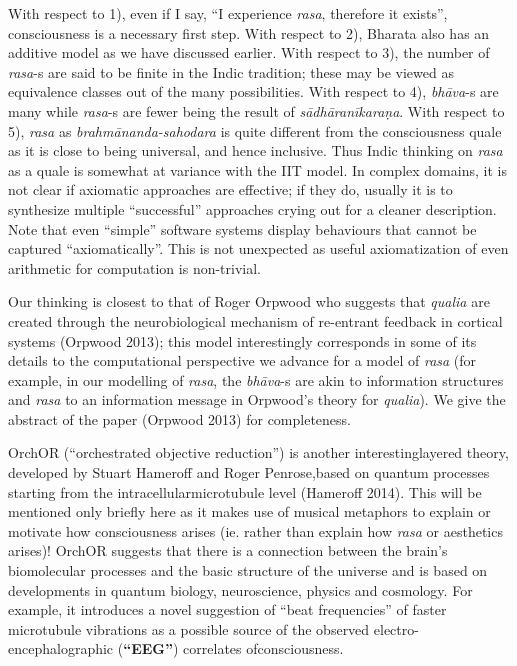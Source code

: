 With respect to 1), even if I say, “I experience \textsl{rasa}, therefore it exists”, consciousness is a necessary first step. With respect to 2), Bharata also has an additive model as we have discussed earlier. With respect to 3), the number of \textsl{rasa}-s are said to be finite in the Indic tradition; these may be viewed as equivalence classes out of the many possibilities. With respect to 4), \textsl{bhāva}-s are many while \textsl{rasa}-s are fewer being the result of \textsl{sādhāranīkaraṇa}. With respect to 5), \textsl{rasa} as  \textsl{brahmānanda-sahodara} is quite different from the consciousness quale as it is close to being universal, and hence inclusive. Thus Indic thinking on \textsl{rasa} as a quale is somewhat at variance with the IIT model. In complex domains, it is not clear if axiomatic approaches are effective; if they do, usually it is to synthesize multiple “successful” approaches crying out for a cleaner description. Note that even “simple” software systems display behaviours that cannot be captured “axiomatically”. This is not unexpected as useful axiomatization of even arithmetic for computation is non-trivial.

Our thinking is closest to that of Roger Orpwood who suggests that \textsl{qualia} are created through the neurobiological mechanism of re-entrant feedback in cortical systems (Orpwood 2013); this model interestingly corresponds in some of its details to the computational perspective we advance for a model of \textsl{rasa} (for example, in our modelling of \textsl{rasa}, the \textsl{bhāva}-s are akin to information structures and \textsl{rasa} to an information message in Orpwood’s theory for \textsl{qualia}). We give the abstract of the paper (Orpwood 2013) for completeness.


OrchOR (“orchestrated objective reduction”) is another interesting\break layered theory, developed by Stuart Hameroff and Roger Penrose,\break based on quantum processes starting from the intracellular\break micro\-tubule level (Hameroff 2014). This will be mentioned only briefly here as it makes use of musical metaphors to explain or motivate how consciousness arises (ie. rather than explain how \textsl{rasa} or aesthetics arises)! OrchOR suggests that there is a connection between the brain’s biomolecular processes and the basic structure of the universe and is based on developments in quantum biology, neuroscience, physics and cosmology. For example, it introduces a novel suggestion of “beat frequencies” of faster microtubule vibrations as a possible source of the observed electro-encephalographic (\textbf{“EEG”}) correlates of\break con\-scious\-ness.\\[-20pt]

